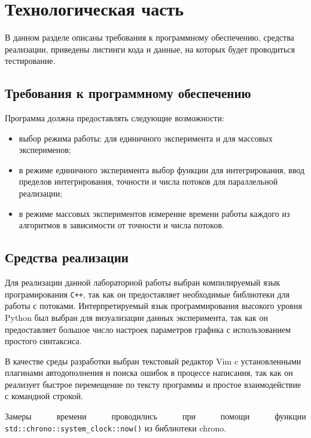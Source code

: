 \chapter{Технологическая часть}

В данном разделе описаны требования к программному обеспечению, средства
реализации, приведены листинги кода и данные, на которых будет проводиться
тестирование.

\section{Требования к программному обеспечению}

Программа должна предоставлять следующие возможности:
\begin{itemize}[left=\parindent]
    \item выбор режима работы: для единичного эксперимента и для массовых
          эксперименов;
    \item в режиме единичного эксперимента выбор функции для интегрирования,
          ввод пределов интегрирования, точности и числа потоков для
          параллельной реализации;
    \item в режиме массовых экспериментов измерение времени работы каждого из
          алгоритмов в зависимости от точности и числа потоков.
\end{itemize}

\section{Средства реализации}

Для реализации данной лабораторной работы выбран компилируемый язык
програмирования \texttt{C++}\cite{cpp}, так как он предоставляет необходимые библиотеки
для работы с потоками. Интерпретируемый язык программирования высокого уровня
Python\cite{python} был выбран для визуализации данных эксперимента, так как он
предоставляет большое число настроек параметров графика с использованием
простого синтаксиса. 

В качестве среды разработки выбран текстовый редактор Vim\cite{vim} c
установленными плагинами автодополнения и поиска ошибок в процессе написания,
так как он реализует быстрое перемещение по тексту программы и простое
взаимодействие с командной строкой.

Замеры~~~~~~времени~~~~~~проводились~~~~~~при~~~~~~помощи~~~~~~функции \texttt{std::chrono::system\_clock::now()}
из библиотеки chrono\cite{chrono}.

